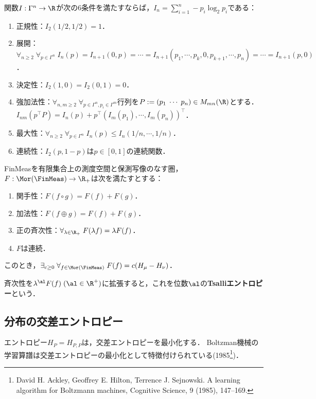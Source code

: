 \documentclass[uplatex,dvipdfmx]{jsreport}
\begin{document}
\begin{theorem}
    関数$I:\Gamma^n\to\R$が次の6条件を満たすならば，$I_n=\sum_{i=1}^n-p_i\log_2p_i$である：
    \begin{enumerate}
        \item 正規性：$I_2(1/2,1/2)=1$．
        \item 展開：$\forall_{n\ge2}\;\forall_{p\in\Gamma^n}\;I_n(p)=I_{n+1}(0,p)=\cdots=I_{n+1}(p_1,\cdots,p_k,0,p_{k+1},\cdots,p_n)=\cdots=I_{n+1}(p,0)$．
        \item 決定性：$I_2(1,0)=I_2(0,1)=0$．
        \item 強加法性：$\forall_{n,m\ge2}\;\forall_{p\in\Gamma^n,p_i\in\Gamma^m}$行列を$P:=(p_1\;\cdots\;p_n)\in M_{mn}(\R)$とする．$I_{nm}(p^\top P)=I_n(p)+p^\top(I_m(p_1),\cdots,I_m(p_n))^\top$．
        \item 最大性：$\forall_{n\ge2}\;\forall_{p\in\Gamma^n}\;I_n(p)\le I_n(1/n,\cdots,1/n)$．
        \item 連続性：$I_2(p,1-p)$は$p\in[0,1]$の連続関数．
    \end{enumerate}
\end{theorem}

\begin{theorem}[エントロピーの関手としての特徴付け]
    FinMeasを有限集合上の測度空間と保測写像のなす圏，$F:\Mor(\FinMeas)\to\R_+$は次を満たすとする：
    \begin{enumerate}
        \item 関手性：$F(f\circ g)=F(f)+F(g)$．
        \item 加法性：$F(f\oplus g)=F(f)+F(g)$．
        \item 正の斉次性：$\forall_{\lambda\in\R_+}\;F(\lambda f)=\lambda F(f)$．
        \item $F$は連続．
    \end{enumerate}
    このとき，$\exists_{c\ge0}\;\forall_{f\in\Mor(\FinMeas)}\;F(f)=c(H_\mu-H_\nu)$．
\end{theorem}
\begin{remarks}
    斉次性を$\lambda^\al F(f)\;(\al\in\R^+)$に拡張すると，これを位数$\al$の\textbf{Tsalliエントロピー}という．
\end{remarks}

\subsection{分布の交差エントロピー}

\begin{tcolorbox}[colframe=ForestGreen, colback=ForestGreen!10!white,breakable,colbacktitle=ForestGreen!40!white,coltitle=black,fonttitle=\bfseries\sffamily,
title=]
    エントロピー$H_P=H_{P,P}$は，交差エントロピーを最小化する．
    Boltzman機械の学習算譜は交差エントロピーの最小化として特徴付けられている(1985\footnote{David H. Ackley, Geoffrey E. Hilton, Terrence J. Sejnowski. A learning algorithm for Boltzmann machines, Cognitive Science, 9 (1985), 147–169.})．
\end{tcolorbox}
\end{document}
